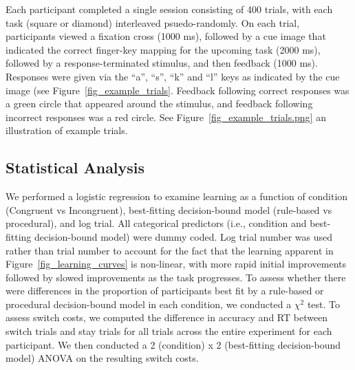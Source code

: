 \documentclass[doc, floatsintext]{apa7}
\begin{document}
Each participant completed a single session consisting of
400 trials, with each task (square or diamond) interleaved
psuedo-randomly.   On each trial, participants viewed a
fixation cross (1000 ms), followed by a cue image that
indicated the correct finger-key mapping for the upcoming
task (2000 ms), followed by a response-terminated stimulus,
and then feedback (1000 ms).  Responses were given via the
``a'', ``s'', ``k'' and ``l'' keys as indicated by the cue
image (see Figure~\ref{fig_example_trials}. Feedback
following correct responses was a green circle that appeared
around the stimulus, and feedback following incorrect
responses was a red circle. See
Figure~\ref{fig_example_trials.png} an illustration of
example trials.

\subsection{Statistical Analysis}
We performed a logistic regression to examine learning as a
function of condition (Congruent vs Incongruent),
best-fitting decision-bound model (rule-based vs
procedural), and log trial. All categorical predictors
(i.e., condition and best-fitting decision-bound model) were
dummy coded. Log trial number was used rather than trial
number to account for the fact that the learning apparent in
Figure~\ref{fig_learning_curves} is non-linear, with more
rapid initial improvements followed by slowed improvements
as the task progresses. To assess whether there were
differences in the proportion of participants best fit by a
rule-based or procedural decision-bound model in each
condition, we conducted a $\chi^2$ test. To assess switch
costs, we computed the difference in accuracy and RT between
switch trials and stay trials for all trials across the
entire experiment for each participant. We then conducted a
2 (condition) x 2 (best-fitting decision-bound model) ANOVA
on the resulting switch costs.
\end{document}
